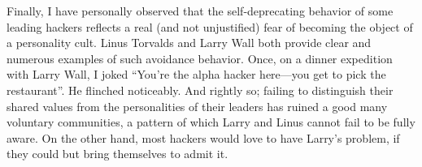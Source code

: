 Finally, I have personally observed that the self-deprecating behavior of some
leading hackers reflects a real (and not unjustified) fear of becoming the
object of a personality cult.  Linus Torvalds and Larry Wall both provide clear
and numerous examples of such avoidance behavior.  Once, on a dinner expedition
with Larry Wall, I joked ``You're the alpha hacker here—you get to pick the
restaurant''.  He flinched noticeably.  And rightly so; failing to distinguish
their shared values from the personalities of their leaders has ruined a good
many voluntary communities, a pattern of which Larry and Linus cannot fail to be
fully aware.  On the other hand, most hackers would love to have Larry's
problem, if they could but bring themselves to admit it.
